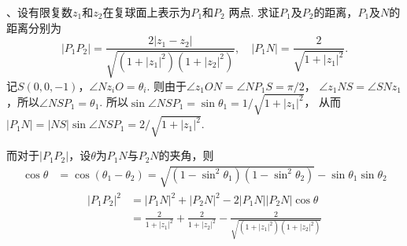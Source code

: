 \vspace{1cm}
\par{}、设有限复数$z_1$和$z_2$在复球面上表示为$P_1$和$P_2$
  两点. 求证$P_1$及$P_2$的距离，$P_1$及$N$的距离分别为
  \[
    |P_1P_2| = \frac{2|z_1-z_2|}{\sqrt{(1+|z_1|^2)(1+|z_2|^2)}},\quad
    |P_1N| = \frac{2}{\sqrt{1+|z_1|^2}}.
  \]
\proof
  记$S(0, 0, -1)$，$\angle Nz_iO=\theta_i$. 则由于$\angle z_1ON = \angle NP_1S = \pi / 2$，
  $\angle z_1NS = \angle SNz_1$，所以$\angle NSP_1 = \theta_1$.
  所以$\sin\angle NSP_1 = \sin\theta_1 = 1/\sqrt{1+|z_1|^2}$，
  从而$|P_1N| = |NS|\sin\angle NSP_1 = 2 / \sqrt{1+|z_1|^2}$.\par
  而对于$|P_1P_2|$，设$\theta$为$P_1N$与$P_2N$的夹角，则
  \[\begin{split}
    \cos\theta &= \cos(\theta_1 - \theta_2) =
      \sqrt{(1-\sin^2\theta_1)(1-\sin^2\theta_2)} - \sin\theta_1\sin\theta_2
  \end{split}\]
  \[\begin{split}
    |P_1P_2|^2 &= |P_1N|^2 + |P_2N|^2 - 2|P_1N||P_2N|\cos\theta \\
     &= \frac{2}{1+|z_1|^2} + \frac{2}{1+|z_2|^2} -
        \frac{2}{\sqrt{(1+|z_1|^2)(1+|z_2|^2)}}
  \end{split}\]



